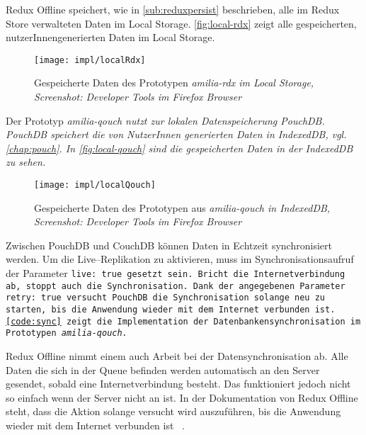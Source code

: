%
%
Redux Offline speichert, wie in \autoref{sub:reduxpersist} beschrieben, alle im Redux Store verwalteten Daten im Local Storage.
\autoref{fig:local-rdx} zeigt alle gespeicherten, nutzerInnengenerierten Daten im Local Storage.
%
\begin{figure}[H]
  \centering
  \texttt{[image: impl/localRdx]}
  \grayRule
  \caption[Gespeicherte Daten im Local Storage]{Gespeicherte Daten des Prototypen \it{amilia-rdx} im Local Storage,\\Screenshot: Developer Tools im Firefox Browser}
  \label{fig:local-rdx}
\end{figure}
% 
Der Prototyp \it{amilia-qouch} nutzt zur lokalen Datenspeicherung PouchDB. PouchDB speichert die von NutzerInnen generierten Daten in IndexedDB, vgl. \autoref{chap:pouch}. In \autoref{fig:local-qouch} sind die gespeicherten Daten in der IndexedDB zu sehen.
%
\begin{figure}[H]
  \centering
  \texttt{[image: impl/localQouch]}
  \grayRule
  \caption[Gespeicherte Daten in IndexedDB]{Gespeicherte Daten des Prototypen aus \it{amilia-qouch} in IndexedDB,\\Screenshot: Developer Tools im Firefox Browser}
  \label{fig:local-qouch}
\end{figure}
%
%
Zwischen PouchDB und CouchDB können Daten in Echtzeit synchronisiert werden.
Um die Live--Replikation zu aktivieren, muss im Synchronisationsaufruf der Parameter \tt{live: true} gesetzt sein.
Bricht die Internetverbindung ab, stoppt auch die Synchronisation.
Dank der angegebenen Parameter \tt{retry: true} versucht PouchDB die Synchronisation solange neu zu starten, bis die Anwendung wieder mit dem Internet verbunden ist. \autoref{code:sync} zeigt die Implementation der Datenbankensynchronisation im Prototypen \it{amilia-qouch}.
%
\begin{center}
  
\end{center}
% 
Redux Offline nimmt einem auch Arbeit bei der Datensynchronisation ab.
Alle Daten die sich in der Queue befinden werden automatisch an den Server gesendet, sobald eine Internetverbindung besteht.
Das funktioniert jedoch nicht so einfach wenn der Server nicht an ist.
In der Dokumentation von Redux Offline steht, dass die Aktion solange versucht wird auszuführen, bis die Anwendung wieder mit dem Internet verbunden ist ~\cite{giving-up}.
